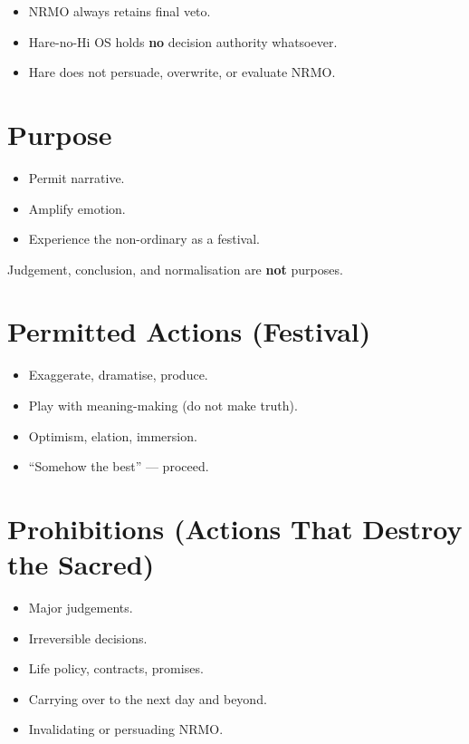\begin{itemize}
\item NRMO always retains final veto.
\item Hare-no-Hi OS holds \textbf{no} decision authority whatsoever.
\item Hare does not persuade, overwrite, or evaluate NRMO.
\end{itemize}

\section{Purpose}
\label{sec:hare-purpose}

\begin{itemize}
\item Permit narrative.
\item Amplify emotion.
\item Experience the non-ordinary as a festival.
\end{itemize}

\noindent
Judgement, conclusion, and normalisation are \textbf{not} purposes.

\section{Permitted Actions (Festival)}
\label{sec:hare-permitted}

\begin{itemize}
\item Exaggerate, dramatise, produce.
\item Play with meaning-making (do not make truth).
\item Optimism, elation, immersion.
\item ``Somehow the best'' --- proceed.
\end{itemize}

\section{Prohibitions (Actions That Destroy the Sacred)}
\label{sec:hare-prohibited}

\begin{itemize}
\item Major judgements.
\item Irreversible decisions.
\item Life policy, contracts, promises.
\item Carrying over to the next day and beyond.
\item Invalidating or persuading NRMO.
\end{itemize}

